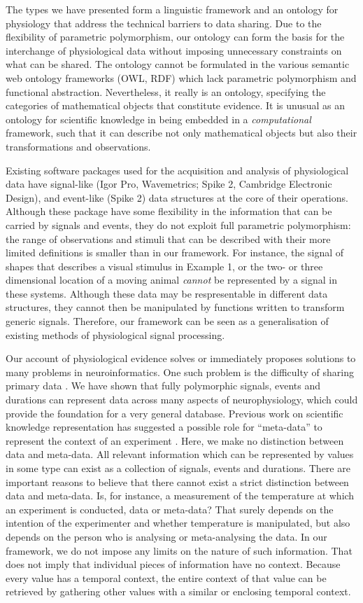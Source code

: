 The types we have presented form a linguistic framework and an
ontology for physiology that address the technical barriers to data
sharing. Due to the flexibility of parametric polymorphism, our
ontology can form the basis for the interchange of physiological data
without imposing unnecessary constraints on what can be shared. The
ontology cannot be formulated in the various semantic web ontology
frameworks (OWL, RDF) which lack parametric polymorphism and
functional abstraction. Nevertheless, it really is an ontology,
specifying the categories of mathematical objects that constitute
evidence. It is unusual as an ontology for scientific knowledge in
being embedded in a \emph{computational} framework, such that it can
describe not only mathematical objects but also their transformations
and observations.

Existing software packages used for the acquisition and analysis of
physiological data have signal-like (Igor Pro, Wavemetrics; Spike 2,
Cambridge Electronic Design), and event-like (Spike 2) data structures
at the core of their operations. Although these package have some
flexibility in the information that can be carried by signals and
events, they do not exploit full parametric polymorphism: the range of
observations and stimuli that can be described with their more limited
definitions is smaller than in our framework. For instance, the signal
of shapes that describes a visual stimulus in Example 1, or the two-
or three dimensional location of a moving animal \emph{cannot} be
represented by a signal in these systems. Although these data may be
respresentable in different data structures, they cannot then be
manipulated by functions written to transform generic
signals. Therefore, our framework can be seen as a generalisation of
existing methods of physiological signal processing.

Our account of physiological evidence solves or immediately proposes
solutions to many problems in neuroinformatics. One such problem is
the difficulty of sharing primary data \citep{Amari2002}. We have
shown that fully polymorphic signals, events and durations can
represent data across many aspects of neurophysiology, which could
provide the foundation for a very general database. Previous work on
scientific knowledge representation has suggested a possible role for
``meta-data'' to represent the context of an experiment
\citep{Bower2009}. Here, we make no distinction between data and
meta-data. All relevant information which can be represented by values
in some type can exist as a collection of signals, events and
durations. There are important reasons to believe that there cannot
exist a strict distinction between data and meta-data. Is, for
instance, a measurement of the temperature at which an experiment is
conducted, data or meta-data?  That surely depends on the intention of
the experimenter and whether temperature is manipulated, but also
depends on the person who is analysing or meta-analysing the data. In
our framework, we do not impose any limits on the nature of such
information. That does not imply that individual pieces of information
have no context. Because every value has a temporal context, the
entire context of that value can be retrieved by gathering other
values with a similar or enclosing temporal context.

